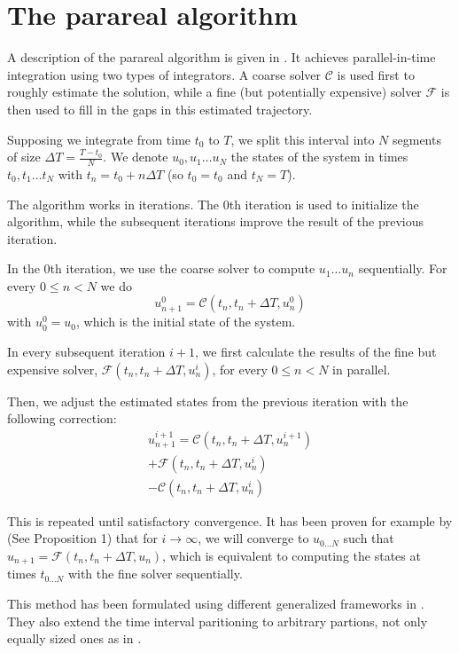 \documentclass[conference]{IEEEtran}
\begin{document}
\section{The parareal algorithm}

A description of the parareal algorithm is given in \cite{parareal}. It achieves parallel-in-time integration using two types of integrators. A coarse solver $\mathcal{C}$ is used first to roughly estimate the solution, while a fine (but potentially expensive) solver $\mathcal{F}$ is then used to fill in the gaps in this estimated trajectory.

Supposing we integrate from time $t_0$ to $T$, we split this interval into $N$ segments of size $\Delta T = \frac{T-t_0}{N}$. We denote $u_0, u_1\dots u_N$ the states of the system in times $t_0, t_1\dots t_N$ with $t_n = t_0 + n\Delta T$ (so $t_0 = t_0$ and $t_N = T$).

The algorithm works in iterations. The 0th iteration is used to initialize the algorithm, while the subsequent iterations improve the result of the previous iteration.

In the 0th iteration, we use the coarse solver to compute $u_1\dots u_n$ sequentially. For every $0 \leq n < N$ we do
$$
u^0_{n+1} = \mathcal{C}(t_n, t_n+\Delta T, u^0_n)
$$
with $u^0_0 = u_0$, which is the initial state of the system.

In every subsequent iteration $i+1$, we first calculate the results of the fine but expensive solver, $\mathcal{F}(t_n, t_n+\Delta T, u^{i}_n)$, for every $0 \leq n < N$ in parallel.

Then, we adjust the estimated states from the previous iteration with the following correction:
\begin{multline}
u^{i+1}_{n+1} = \mathcal{C}(t_n, t_n+\Delta T, u^{i+1}_n)\\ + \mathcal{F}(t_n, t_n+\Delta T, u^i_n)\\ - \mathcal{C}(t_n, t_n+\Delta T, u^{i}_n)
\end{multline}

This is repeated until satisfactory convergence. It has been proven for example by \cite{parareal} (See Proposition 1) that for $i \to \infty$, we will converge to $u_{0\dots N}$ such that $u_{n+1} = \mathcal{F}(t_n, t_n+\Delta T, u_n)$, which is equivalent to computing the states at times $t_{0\dots N}$ with the fine solver sequentially.

This method has been formulated using different generalized frameworks in \cite{parareal2}. They also extend the time interval paritioning to arbitrary partions, not only equally sized ones as in \cite{parareal}.
\end{document}
